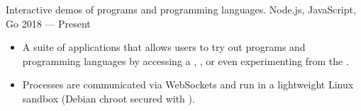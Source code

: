 \showoff
{}
{Interactive demos of programs and programming languages.}
{Node.js, JavaScript, Go}
{2018 --- Present}

\begin{itemize}[label=$\triangleright$]
    \item A suite of applications that allows users to try out programs and programming languages by accessing a , , or even experimenting from the .
    \item Processes are communicated via WebSockets and run in a lightweight Linux sandbox (Debian chroot secured with ).
\end{itemize}
